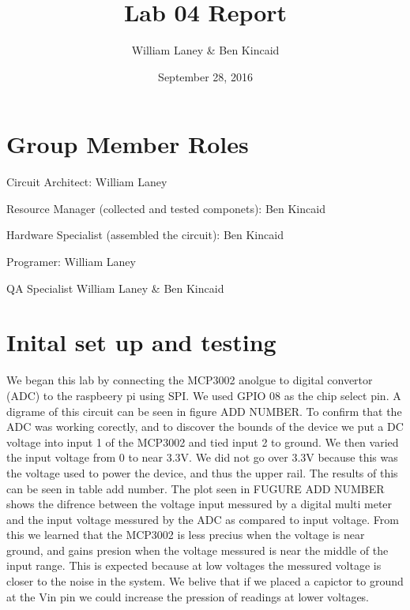 \documentclass[prl,12pt,notitlepage,aps,onecolumn,superscriptaddress]{revtex4-1}
\begin{document}
\title{Lab 04 Report}
\author{William Laney \& Ben Kincaid}
\date{September 28, 2016}
\maketitle

\section{Group Member Roles}

Circuit Architect: William Laney

Resource Manager (collected and tested componets): Ben Kincaid

Hardware Specialist (assembled the circuit): Ben Kincaid

Programer: William Laney

QA Specialist William Laney \& Ben Kincaid

\section{Inital set up and testing}
We began this lab by connecting the MCP3002 anolgue to digital convertor (ADC) to the raspbeery pi using SPI. We used GPIO 08 as the chip select pin. A digrame of this circuit can be seen in figure ADD NUMBER. To confirm that the ADC was working corectly, and to discover the bounds of the device we put a DC voltage into input 1 of the MCP3002 and tied input 2 to ground. We then varied the input voltage from 0 to near 3.3V. We did not go over 3.3V because this was the voltage used to power the device, and thus the upper rail. The results of this can be seen in table add number. The plot seen in FUGURE ADD NUMBER shows the difrence between the voltage input messured by a digital multi meter and the input voltage messured by the ADC as compared to input voltage. From this we learned that the MCP3002 is less precius when the voltage is near ground, and gains presion when the voltage messured is near the middle of the input range. This is expected because at low voltages the messured voltage is closer to the noise in the system. We belive that if we placed a capictor to ground at the Vin pin we could increase the pression of readings at lower voltages.
\end{document}
